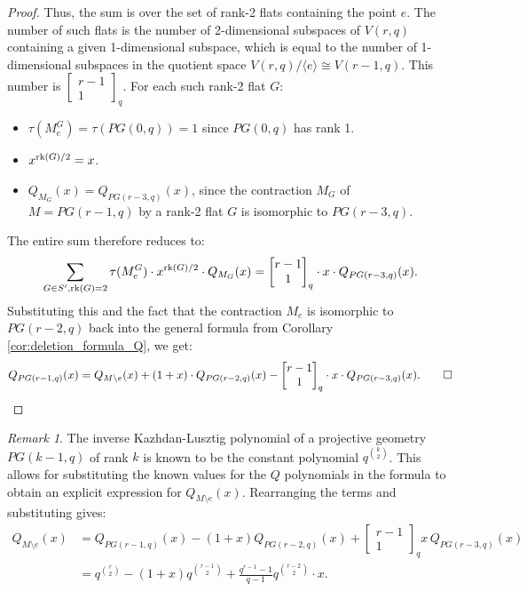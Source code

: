 \documentclass[10pt]{article}
\newcommand{\rank}{\normalfont\text{rk}}
\newcommand{\qbinom}[2]{\begin{bmatrix} #1 \\ #2 \end{bmatrix}_q}
\theoremstyle{remark}
\newtheorem*{remark}{Remark} %
\begin{document}
\begin{proof}
Thus, the sum is over the set of rank-2 flats containing the point $e$.
The number of such flats is the number of 2-dimensional subspaces of $V(r,q)$ containing a given 1-dimensional subspace, which is equal to the number of 1-dimensional subspaces in the quotient space $V(r,q)/\langle e \rangle \cong V(r-1,q)$. This number is $\qbinom{r-1}{1}$. For each such rank-2 flat $G$:
\begin{itemize}
    \item $\tau(M^G_e) = \tau(PG(0,q)) = 1$ since $PG(0,q)$ has rank 1.
    \item $x^{\rank(G)/2} = x$.
    \item $Q_{M_G}(x) = Q_{PG(r-3,q)}(x)$, since the contraction $M_G$ of $M=PG(r-1,q)$ by a rank-2 flat $G$ is isomorphic to $PG(r-3,q)$.
\end{itemize}
The entire sum therefore reduces to:
\[
\sum_{G \in S', \rank(G)=2} \tau(M^G_e)\cdot x^{\rank(G)/2} \cdot Q_{M_G}(x) = \qbinom{r-1}{1} \cdot x \cdot Q_{PG(r-3,q)}(x).
\]
Substituting this and the fact that the contraction $M_e$ is isomorphic to $PG(r-2,q)$ back into the general formula from Corollary \ref{cor:deletion_formula_Q}, we get:
\[
    Q_{PG(r-1,q)}(x) = Q_{M\setminus e}(x) + (1 + x)\cdot Q_{PG(r-2,q)}(x) - \qbinom{r-1}{1} \cdot x \cdot Q_{PG(r-3,q)}(x). \qed
\]
\end{proof}
\begin{remark}
The inverse Kazhdan-Lusztig polynomial of a projective geometry $PG(k-1,q)$ of rank $k$ is known to be the constant polynomial $q^{\binom{k}{2}}$. This allows for substituting the known values for the $Q$ polynomials in the formula to obtain an explicit expression for $Q_{M\setminus e}(x)$. Rearranging the terms and substituting gives:
\begin{align*}
    Q_{M\setminus e}(x) &= Q_{PG(r-1,q)}(x) - (1+x)Q_{PG(r-2,q)}(x) + \qbinom{r-1}{1} x \, Q_{PG(r-3,q)}(x) \\
    &= q^{\binom{r}{2}} - (1+x)q^{\binom{r-1}{2}} + \frac{q^{r-1}-1}{q-1} q^{\binom{r-2}{2}}\cdot x .
\end{align*}
\end{remark}

\printbibliography
\end{document}
